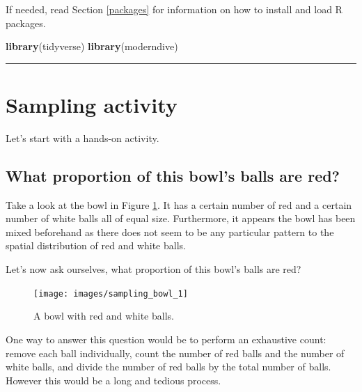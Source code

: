 \documentclass[12pt, krantz2,]{krantz}
\makeatletter
\newenvironment{Shaded}{\begin{snugshade}}{\end{snugshade}}
\newcommand{\KeywordTok}[1]{\textcolor[rgb]{0.27,0.27,0.27}{\textbf{#1}}}
\newcommand{\NormalTok}[1]{#1}
\newenvironment{kframe}{%
\medskip{}
\setlength{\fboxsep}{.8em}
 \def\at@end@of@kframe{}%
 \ifinner\ifhmode%
  \def\at@end@of@kframe{\end{minipage}}%
  \begin{minipage}{\columnwidth}%
 \fi\fi%
 \def\FrameCommand##1{\hskip\@totalleftmargin \hskip-\fboxsep
 \colorbox{shadecolor}{##1}\hskip-\fboxsep
     \hskip-\linewidth \hskip-\@totalleftmargin \hskip\columnwidth}%
 \MakeFramed {\advance\hsize-\width
   \@totalleftmargin\z@ \linewidth\hsize
   \@setminipage}}%
 {\par\unskip\endMakeFramed%
 \at@end@of@kframe}
\renewenvironment{Shaded}{\begin{kframe}}{\end{kframe}}
\makeatother
\begin{document}
If needed, read Section \ref{packages} for information on how to install and load R packages.

\begin{Shaded}
\begin{Highlighting}[]
\KeywordTok{library}\NormalTok{(tidyverse)}
\KeywordTok{library}\NormalTok{(moderndive)}
\end{Highlighting}
\end{Shaded}

\begin{center}\rule{0.5\linewidth}{\linethickness}\end{center}

\hypertarget{sampling-activity}{%
\section{Sampling activity}\label{sampling-activity}}

Let's start with a hands-on activity.

\hypertarget{what-proportion-of-this-bowls-balls-are-red}{%
\subsection{What proportion of this bowl's balls are red?}\label{what-proportion-of-this-bowls-balls-are-red}}

Take a look at the bowl in Figure \ref{fig:sampling-exercise-1}. It has a certain number of red and a certain number of white balls all of equal size. Furthermore, it appears the bowl has been mixed beforehand as there does not seem to be any particular pattern to the spatial distribution of red and white balls.

Let's now ask ourselves, what proportion of this bowl's balls are red?

\begin{figure}

{\centering \texttt{[image: images/sampling\_bowl\_1]} 

}

\caption{A bowl with red and white balls.}\label{fig:sampling-exercise-1}
\end{figure}

One way to answer this question would be to perform an exhaustive count: remove each ball individually, count the number of red balls and the number of white balls, and divide the number of red balls by the total number of balls. However this would be a long and tedious process.
\end{document}
